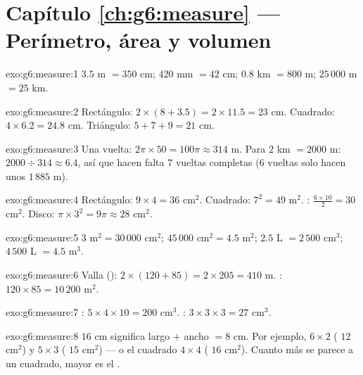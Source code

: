 \section*{Capítulo \ref{ch:g6:measure} --- Perímetro, área y volumen}

\begin{solution}{exo:g6:measure:1}
$3.5$ m $= 350$ cm; \quad $420$ mm $= 42$ cm; \quad
$0.8$ km $= 800$ m; \quad $25\,000$ m $= 25$ km.
\end{solution}

\begin{solution}{exo:g6:measure:2}
Rectángulo: $2 \times (8 + 3.5) = 2 \times 11.5 = 23$ cm.
Cuadrado: $4 \times 6.2 = 24.8$ cm.
Triángulo: $5 + 7 + 9 = 21$ cm.
\end{solution}

\begin{solution}{exo:g6:measure:3}
Una vuelta: $2\pi \times 50 = 100\pi \approx 314$ m. Para $2$ km
$= 2000$ m: $2000 \div 314 \approx 6.4$, así que hacen falta $7$ vueltas completas
($6$ vueltas solo hacen unos $1\,885$ m).
\end{solution}

\begin{solution}{exo:g6:measure:4}
Rectángulo: $9 \times 4 = 36$ cm$^2$. Cuadrado: $7^2 = 49$ m$^2$.
: $\frac{6 \times 10}{2} = 30$ cm$^2$.
Disco: $\pi \times 3^2 = 9\pi \approx 28$ cm$^2$.
\end{solution}

\begin{solution}{exo:g6:measure:5}
$3$ m$^2 = 30\,000$ cm$^2$; \quad
$45\,000$ cm$^2 = 4.5$ m$^2$; \quad
$2.5$ L $= 2\,500$ cm$^3$; \quad
$4\,500$ L $= 4.5$ m$^3$.
\end{solution}

\begin{solution}{exo:g6:measure:6}
Valla (): $2 \times (120 + 85) = 2 \times 205 = 410$ m.
: $120 \times 85 = 10\,200$ m$^2$.
\end{solution}

\begin{solution}{exo:g6:measure:7}
: $5 \times 4 \times 10 = 200$ cm$^3$. :
$3 \times 3 \times 3 = 27$ cm$^3$.
\end{solution}

\begin{solution}{exo:g6:measure:8}
 $16$ cm significa largo $+$ ancho $= 8$ cm. Por ejemplo,
$6 \times 2$ ( $12$ cm$^2$) y $5 \times 3$ ( $15$ cm$^2$)
--- o el cuadrado $4 \times 4$ ( $16$ cm$^2$). Cuanto más se parece a un
cuadrado, mayor es el .
\end{solution}

